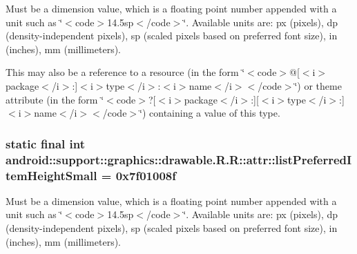 Must be a dimension value, which is a floating point number appended with a unit such as \char`\"{}$<$code$>$14.5sp$<$/code$>$\char`\"{}. Available units are: px (pixels), dp (density-independent pixels), sp (scaled pixels based on preferred font size), in (inches), mm (millimeters). 

This may also be a reference to a resource (in the form \char`\"{}$<$code$>$@\mbox{[}$<$i$>$package$<$/i$>$:\mbox{]}$<$i$>$type$<$/i$>$:$<$i$>$name$<$/i$>$$<$/code$>$\char`\"{}) or theme attribute (in the form \char`\"{}$<$code$>$?\mbox{[}$<$i$>$package$<$/i$>$:\mbox{]}\mbox{[}$<$i$>$type$<$/i$>$:\mbox{]}$<$i$>$name$<$/i$>$$<$/code$>$\char`\"{}) containing a value of this type. \hypertarget{classandroid_1_1support_1_1graphics_1_1drawable_1_1_r_1_1attr_cdfbf9c45b217bb839a51dd07e47289b}{
\subsubsection[{listPreferredItemHeightSmall}]{\setlength{\rightskip}{0pt plus 5cm}static final int android::support::graphics::drawable.R.R::attr::listPreferredItemHeightSmall = 0x7f01008f}}
\label{classandroid_1_1support_1_1graphics_1_1drawable_1_1_r_1_1attr_cdfbf9c45b217bb839a51dd07e47289b}


Must be a dimension value, which is a floating point number appended with a unit such as \char`\"{}$<$code$>$14.5sp$<$/code$>$\char`\"{}. Available units are: px (pixels), dp (density-independent pixels), sp (scaled pixels based on preferred font size), in (inches), mm (millimeters). 


